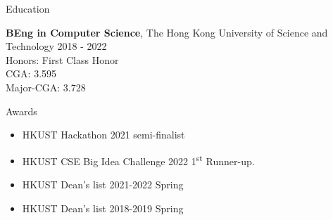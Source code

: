 \documentclass{resume} %
\begin{document}
\begin{rSection}{Education}
    
    {\bf BEng in Computer Science}, The Hong Kong University of Science and Technology \hfill {2018 - 2022}\\
    Honors: First Class Honor\\
    CGA: 3.595\\
    Major-CGA: 3.728
    
    
    
\end{rSection}

\begin{rSection}{Awards}
    \begin{itemize}
        \item 	HKUST Hackathon 2021 semi-finalist
        \item	HKUST CSE Big Idea Challenge 2022 1\textsuperscript{st} Runner-up.
        \item   HKUST Dean's list 2021-2022 Spring
        \item   HKUST Dean's list 2018-2019 Spring
    \end{itemize}
\end{rSection}
\end{document}
